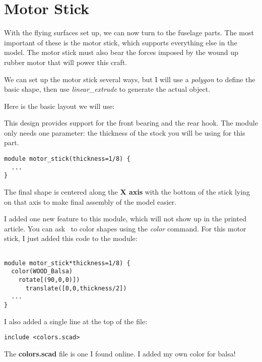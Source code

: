 \section{Motor Stick}

With the flying surfaces set up, we can now turn to the fuselage parts. The
most important of these is the motor stick, which supports everything else in
the model. The motor stick must also bear the forces imposed by the wound up
rubber motor that will power this craft.

We can set up the motor stick several ways, but I will use a {\it polygon} to
define the basic shape, then use {\it linear\_extrude} to generate the actual
object.

Here is the basic layout we will use:


This design provides support for the front bearing and the rear hook. The
module only needs one parameter: the thickness of the stock you will be using
for this part.

\begin{lstlisting}
module motor_stick(thickness=1/8) {
  ...
}
\end{lstlisting}

The final shape is centered along the {\bf X axis} with the bottom of the stick
lying on that axis to make final assembly of the model easier.


I added one new feature to this module, which will not show up in the printed
article. You can ask \osc\ to color shapes using the {\it color} command. For
this motor stick, I just added this code to the module:

\begin{lstlisting}

module motor_stick*thickness=1/8) {
  color(WOOD_Balsa)
    rotate[(90,0,0)])
      translate([0,0,thickness/2])
  ...
}
\end{lstlisting}

I also added a single line at the top of the file:

\begin{lstlisting}
include <colors.scad>
\end{lstlisting}

The {\bf colors.scad} file is one I found online. I added my own color for balsa!

